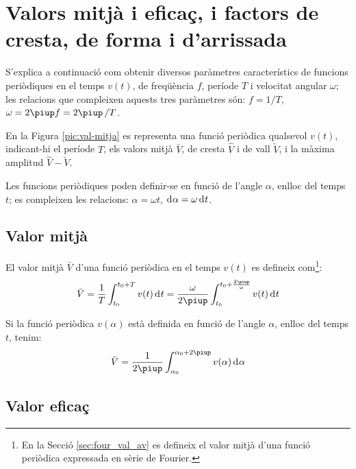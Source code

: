 \section{Valors mitjà i eficaç, i factors de cresta, de forma i
d'arrissada}\label{sec:val_mitja_ef}

S'explica a continuació com obtenir diversos paràmetres característics de funcions periòdiques  en el temps $v(t)$, de freqüència $f$, període $T$ i velocitat angular $\omega$; les relacions que compleixen aquests tres paràmetres són: $f = 1/T$, $\omega=2\piup f = 2\piup\,/T$.

En la Figura \vref{pic:val-mitja} es representa una funció periòdica qualsevol $v(t)$, indicant-hi el període $T$, els valors mitjà $\bar{V}$, de cresta $\hat{V}$ i de vall $\check{V}$, i la màxima amplitud  $\hat{V}-\check{V}$.
\begin{center}
    
    \label{pic:val-mitja}
\end{center}

Les funcions periòdiques poden  definir-se en funció de l'angle $\alpha$, enlloc del temps $t$; es compleixen les relacions:
$\alpha=\omega t$, $\diff\alpha=\omega\diff t$.

\subsection{Valor mitjà}

El valor mitjà $\bar{V}$ d'una funció
periòdica en el temps $v(t)$ es
defineix com\footnote{En la Secció \ref{sec:four_val_av} es defineix el valor mitjà d'una funció periòdica expressada en sèrie de Fourier.}:
\begin{equation}
    \bar{V} = \frac{1}{T} \int_{t_0}^{t_0+T} v(t) \diff t =
    \frac{\omega}{2\piup} \int_{t_0}^{t_0+\frac{2\piup}{\omega}} v(t) \diff t\label{eq:vm_t}
\end{equation}

Si la funció periòdica $v(\alpha)$ està definida en funció de
l'angle $\alpha$, enlloc del temps $t$, tenim:
\begin{equation}
    \bar{V} = \frac{1}{2\piup} \int_{\alpha_0}^{\alpha_0+2\piup} v(\alpha) \diff \alpha
    \label{eq:vm_alfa}
\end{equation}

\subsection{Valor eficaç}

